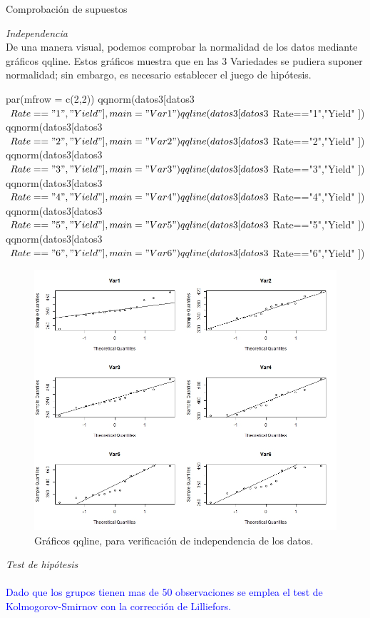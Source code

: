 \documentclass[a4paper,12pt]{article}
\begin{document}
\begin{enumerate}[label=\textbf{\alph*})]
\begin{center}
	Comprobación de supuestos
\end{center}
\textit{Independencia}\\
De una manera visual, podemos comprobar la normalidad de los datos mediante gráficos qqline. 
Estos gráficos muestra que en las 3 Variedades se pudiera suponer normalidad; sin embargo,
es necesario establecer el juego de hipótesis. 
\begin{MyVerbatim}
par(mfrow = c(2,2))
qqnorm(datos3[datos3$Rate=="1","Yield" ], main="Var1")
qqline(datos3[datos3$Rate=="1","Yield" ])
qqnorm(datos3[datos3$Rate=="2","Yield" ], main="Var2")
qqline(datos3[datos3$Rate=="2","Yield" ])
qqnorm(datos3[datos3$Rate=="3","Yield" ], main="Var3")
qqline(datos3[datos3$Rate=="3","Yield" ])
qqnorm(datos3[datos3$Rate=="4","Yield" ], main="Var4")
qqline(datos3[datos3$Rate=="4","Yield" ])
qqnorm(datos3[datos3$Rate=="5","Yield" ], main="Var5")
qqline(datos3[datos3$Rate=="5","Yield" ])
qqnorm(datos3[datos3$Rate=="6","Yield" ], main="Var6")
qqline(datos3[datos3$Rate=="6","Yield" ])
\end{MyVerbatim}
\begin{figure}[H]
	\centering
	\includegraphics[width=0.7\linewidth]{prob5_qqline}
	\caption[prob5_qqline]{Gráficos qqline, para verificación de independencia de los datos.}
	\label{fig:prob5qqline}
\end{figure}
\textit{Test de hipótesis} \\
\\\textcolor{blue}{Dado que los grupos tienen mas de 50 observaciones se emplea el test de Kolmogorov-Smirnov con la corrección de Lilliefors.}


\end{enumerate}
\end{document}
